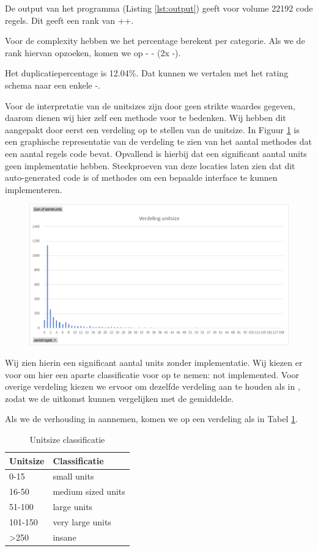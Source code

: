 \documentclass[a4paper]{article}
\begin{document}
De output van het programma (Listing \ref{lst:output}) geeft voor volume 22192 code regels. Dit geeft een rank van ++.

Voor de complexity hebben we het percentage berekent per categorie. Als we de rank hiervan opzoeken, komen we op - - (2x -).

Het duplicatiepercentage is 12.04\%. Dat kunnen we vertalen met het rating schema naar een enkele -.


Voor de interpretatie van de unitsizes zijn door \cite{A} geen strikte waardes gegeven, daarom dienen wij hier zelf een methode voor te bedenken.
Wij hebben dit aangepakt door eerst een verdeling op te stellen van de unitsize. In Figuur \ref{fig:VerdelingUnitsize} is een graphische representatie van de verdeling te zien van het aantal methodes dat een aantal regels code bevat. Opvallend is hierbij dat een significant aantal units geen implementatie hebben. Steekproeven van deze locaties laten zien dat dit auto-generated code is of methodes om een bepaalde interface te kunnen implementeren.
\begin{figure}[htbp]
\centering
\includegraphics[width=0.8 \textwidth]{VerdelingUnitsize.png}
\label{fig:VerdelingUnitsize}
\end{figure}

Wij zien hierin een significant aantal units zonder implementatie. Wij kiezen er voor om hier een aparte classificatie voor op te nemen: not implemented.
Voor overige verdeling kiezen we ervoor om dezelfde verdeling aan te houden als in \cite{B}, zodat we de uitkomst kunnen vergelijken met de gemiddelde.

Als we de verhouding in \cite{B} aannemen, komen we op een verdeling als in Tabel \ref{tbl:UnitSizeClassificatie}.

\begin{table}[h]
\caption{Unitsize classificatie}
\label{tbl:UnitSizeClassificatie}
\begin{tabular}{|l|l|}
\hline
Unitsize         & Classificatie      \\ \hline
0-15             & small units        \\
16-50            & medium sized units \\
51-100           & large units        \\
101-150          & very large units   \\
\textgreater{}250& insane             \\ \hline
\end{tabular}
\end{table}
\end{document}
